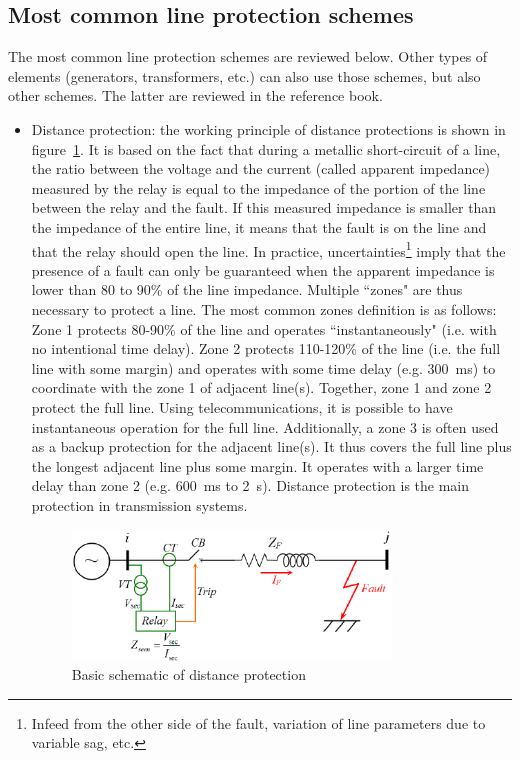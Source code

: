 \subsection{Most common line protection schemes}

The most common line protection schemes are reviewed below. Other types of elements (generators, transformers, etc.) can also use those schemes, but also other schemes. The latter are reviewed in the reference book.

\begin{itemize}
    \item Distance protection: the working principle of distance protections is shown in figure~\ref{fig:distanceFigure}. It is based on the fact that during a metallic short-circuit of a line, the ratio between the voltage and the current (called apparent impedance) measured by the relay is equal to the impedance of the portion of the line between the relay and the fault. If this measured impedance is smaller than the impedance of the entire line, it means that the fault is on the line and that the relay should open the line. In practice, uncertainties\footnote{Infeed from the other side of the fault, variation of line parameters due to variable sag, etc.} imply that the presence of a fault can only be guaranteed when the apparent impedance is lower than 80 to 90\% of the line impedance. Multiple ``zones" are thus necessary to protect a line. The most common zones definition is as follows: Zone 1 protects 80-90\% of the line and operates ``instantaneously" (i.e. with no intentional time delay). Zone 2 protects 110-120\% of the line (i.e. the full line with some margin) and operates with some time delay (e.g. 300~ms) to coordinate with the zone 1 of adjacent line(s). Together, zone 1 and zone 2 protect the full line. Using telecommunications, it is possible to have instantaneous operation for the full line. Additionally, a zone 3 is often used as a backup protection for the adjacent line(s). It thus covers the full line plus the longest adjacent line plus some margin. It operates with a larger time delay than zone 2 (e.g. 600~ms to 2~s). Distance protection is the main protection in transmission systems.
\begin{figure}
    \centering
    \includegraphics[width = 0.8\textwidth]{Figs/Distance.png}
    \caption{Basic schematic of distance protection~\cite{distanceFigure}}
    \label{fig:distanceFigure}
\end{figure}


\end{itemize}
